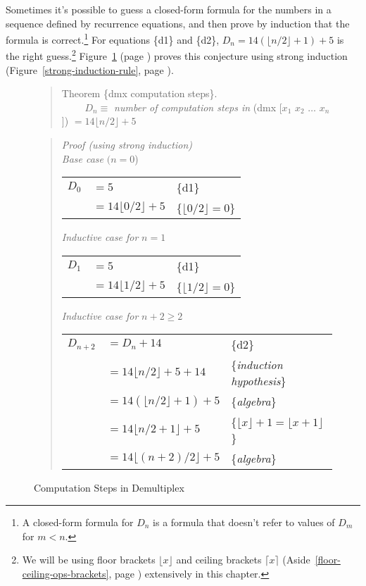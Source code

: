 Sometimes it's possible to guess a closed-form formula
for the numbers in a sequence defined by recurrence equations,
and then prove by induction that the formula is
correct.\footnote{A closed-form formula for $D_n$ is a formula
that doesn't refer to values of $D_m$ for $m < n$.}
For equations \{d1\} and \{d2\},
$D_{n} = 14(\lfloor n/2\rfloor + 1) + 5$ is the right guess.\footnote{We
will be using floor brackets $\lfloor x\rfloor$ and ceiling brackets $\lceil x\rceil$
(Aside~\ref{floor-ceiling-ops-brackets}, page \pageref{floor-ceiling-ops-brackets})
extensively in this chapter.}
Figure~\ref{fig:dmx-computation-time}
(page \pageref{fig:dmx-computation-time}) proves
this conjecture using strong induction
(Figure~\ref{strong-induction-rule}, page \pageref{strong-induction-rule}).

\begin{figure}
\begin{quote}
Theorem \{dmx computation steps\}. \\
~~~~ $D_n \equiv$ \emph{number of computation steps in} (dmx [$x_1$ $x_2$ $\dots$ $x_n$]) $= 14\lfloor n/2\rfloor + 5$
\end{quote}
\begin{quote}
\emph{Proof (using strong induction)} \\
\emph{Base case} $(n=0$) \\
\begin{tabular}{lll}
$D_{0}$&$= 5$                        & \{d1\} \\
       &$= 14\lfloor 0/2\rfloor + 5$ & \{$\lfloor 0/2\rfloor=0$\} \\
\end{tabular}

\emph{Inductive case for} $n=1$\\
\begin{tabular}{lll}
$D_{1}$&$= 5$                        & \{d1\} \\
       &$= 14\lfloor 1/2\rfloor + 5$ & \{$\lfloor 1/2\rfloor=0$\} \\
\end{tabular}

\emph{Inductive case for} $n+2 \geq 2$\\
\begin{tabular}{lll}
$D_{n+2}$ &$= D_n + 14$                      & \{d2\} \\
          &$= 14\lfloor n/2\rfloor + 5 + 14$ & \{\emph{induction hypothesis}\} \\
          &$= 14(\lfloor n/2\rfloor + 1) + 5$& \{\emph{algebra}\} \\
          &$= 14\lfloor n/2 + 1\rfloor + 5$  & \{$\lfloor x\rfloor + 1 = \lfloor x+1\rfloor$\} \\
          &$= 14\lfloor(n+2)/2\rfloor + 5$   & \{\emph{algebra}\} \\
\end{tabular}
\end{quote}
\caption{Computation Steps in Demultiplex}
\label{fig:dmx-computation-time}
\end{figure}


